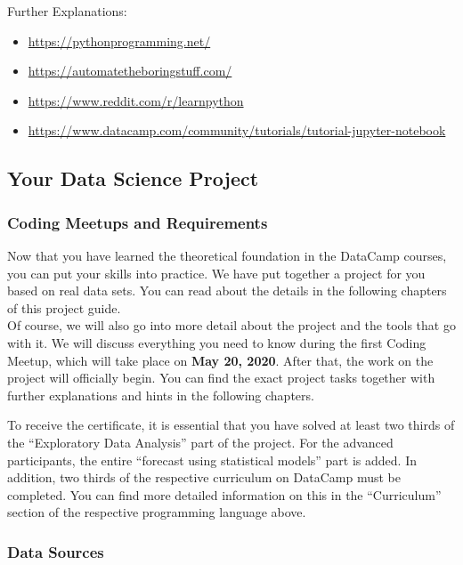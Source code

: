 \documentclass[
  11pt,
]{article}
\providecommand{\tightlist}{%
  \setlength{\itemsep}{0pt}\setlength{\parskip}{0pt}}
\begin{document}
Further Explanations:

\begin{itemize}
\tightlist
\item
  \url{https://pythonprogramming.net/}
\item
  \url{https://automatetheboringstuff.com/}
\item
  \url{https://www.reddit.com/r/learnpython}
\item
  \url{https://www.datacamp.com/community/tutorials/tutorial-jupyter-notebook}
\end{itemize}

\hypertarget{your-data-science-project}{%
\subsection{Your Data Science Project}\label{your-data-science-project}}

\hypertarget{coding-meetups-and-requirements}{%
\subsubsection{Coding Meetups and Requirements}\label{coding-meetups-and-requirements}}

Now that you have learned the theoretical foundation in the DataCamp courses, you can put your skills into practice. We have put together a project for you based on real data sets. You can read about the details in the following chapters of this project guide.\\
Of course, we will also go into more detail about the project and the tools that go with it. We will discuss everything you need to know during the first Coding Meetup, which will take place on \textbf{May 20, 2020}. After that, the work on the project will officially begin.
You can find the exact project tasks together with further explanations and hints in the following chapters.

To receive the certificate, it is essential that you have solved at least two thirds of the ``Exploratory Data Analysis'' part of the project. For the advanced participants, the entire ``forecast using statistical models'' part is added. In addition, two thirds of the respective curriculum on DataCamp must be completed. You can find more detailed information on this in the ``Curriculum'' section of the respective programming language above.

\hypertarget{data-sources}{%
\subsubsection{Data Sources}\label{data-sources}}
\end{document}
